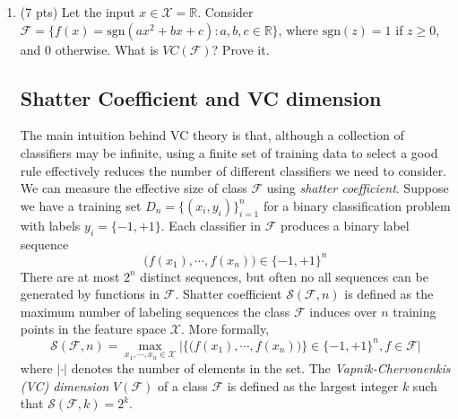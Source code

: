 \documentclass[a4paper]{article}
\theoremstyle{definition}
\newcommand{\sgn}{\mathrm{sgn}}
\def\R{\mathbb R}
\begin{document}
\begin{enumerate}
    \item (7 pts) Let the input $x\in \mathcal{X}=\R$.
Consider $\mathcal{F}=\{f(x)=\sgn(ax^2+bx+c): a, b, c \in \R\}$, where $\sgn(z)=1$ if $z\ge0$, and 0 otherwise.
What is $VC(\mathcal{F})$?  Prove it.

\subsection*{Shatter Coefficient and VC dimension}
The main intuition behind VC theory is that, although a collection of classifiers may be infinite, using a finite set of training data to select a good rule effectively reduces the number of different classifiers we need to consider. We can measure the effective size of class $\mathcal{F}$ using \textit{shatter coefficient}. Suppose we have a training set $D_n = \{(x_i, y_i)\}_{i=1}^n$ for a binary classification problem with labels $y_i = \{-1, +1\}$. Each classifier in $\mathcal{F}$ produces a binary label sequence
$$\big(f(x_1), \cdots, f(x_n)\big) \in \{-1, +1\}^n$$
There are at most $2^n$ distinct sequences, but often no all sequences can be generated by functions in $\mathcal{F}$. Shatter coefficient $\mathcal{S}(\mathcal{F}, n)$ is defined as the maximum number of labeling sequences the class $\mathcal{F}$ induces over $n$ training points in the feature space $\mathcal{X}$. More formally, 
$$\mathcal{S}(\mathcal{F}, n) = \max_{x_1, \cdots, x_n \in \mathcal{X}}
\Bigg|\Big\{\big(f(x_1), \cdots, f(x_n)\big)\Big\} \in \{-1, +1\}^n, f \in \mathcal{F}\Bigg|$$
where $|\cdot|$ denotes the number of elements in the set.
The \textit{Vapnik-Chervonenkis (VC) dimension} $V(\mathcal{F})$ of a class $\mathcal{F}$  is defined as the largest integer $k$ such that $\mathcal{S}(\mathcal{F}, k) = 2^k$.


\end{enumerate}
\end{document}
